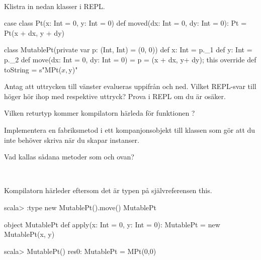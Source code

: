 \QUESTBEGIN

\Task \what~\\Klistra in nedan klasser i REPL.

\begin{Code}
case class Pt(x: Int = 0, y: Int = 0) {
  def moved(dx: Int = 0, dy: Int = 0): Pt = Pt(x + dx, y + dy)
}

class MutablePt(private var p: (Int, Int) = (0, 0)) {
  def x: Int = p._1
  def y: Int = p._2
  def move(dx: Int = 0, dy: Int = 0) = { p = (x + dx, y+ dy); this }
  override def toString = s"MPt($x,$y)"
}
\end{Code}

\Subtask
Antag att uttrycken till vänster evalueras uppifrån och ned. Vilket REPL-svar till höger hör ihop med respektive uttryck? Prova i REPL om du är osäker.

\begin{ConceptConnections}

\end{ConceptConnections}

\Subtask Vilken returtyp kommer kompilatorn härleda för funktionen ?

\Subtask Implementera en fabriksmetod  i ett kompanjonsobjekt till klassen  som gör att du inte behöver skriva  när du skapar instanser.

\Subtask Vad kallas sådana metoder som  och  ovan?

\SOLUTION

\TaskSolved \what~

\SubtaskSolved

\begin{ConceptConnections}

\end{ConceptConnections}


\SubtaskSolved Kompilatorn härleder  eftersom det är typen på självreferensen this.
\begin{REPL}
scala> :type new MutablePt().move()
MutablePt
\end{REPL}

\SubtaskSolved
\begin{Code}
object MutablePt {
  def apply(x: Int = 0, y: Int = 0): MutablePt = new MutablePt(x, y)
}
\end{Code}

\begin{REPL}
scala> MutablePt()
res0: MutablePt = MPt(0,0)
\end{REPL}


